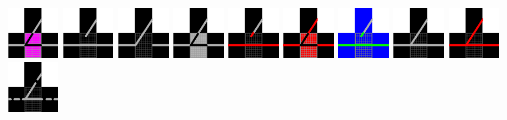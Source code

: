 \documentclass[12pt,a4paper]{article}
\begin{document}
\begin{enumerate}[leftmargin=*]
\includegraphics[width=0.1\textwidth]{symboly/vyh4.png}
\includegraphics[width=0.1\textwidth]{symboly/vyh1.png}
\includegraphics[width=0.1\textwidth]{symboly/vyh2.png}
\includegraphics[width=0.1\textwidth]{symboly/vyh3.png}
\includegraphics[width=0.1\textwidth]{symboly/vyh5.png}
\includegraphics[width=0.1\textwidth]{symboly/vyh6.png}
\includegraphics[width=0.1\textwidth]{symboly/vyh28.png}
\includegraphics[width=0.1\textwidth]{symboly/vyh37.png}
\includegraphics[width=0.1\textwidth]{symboly/vyh38.png}
\includegraphics[width=0.1\textwidth]{symboly/vyh39.png}


\end{enumerate}
\end{document}
